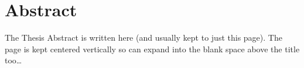 

\chapter*{Abstract} %

The Thesis Abstract is written here (and usually kept to just this page). The page is kept centered vertically so can expand into the blank space above the title too\ldots
